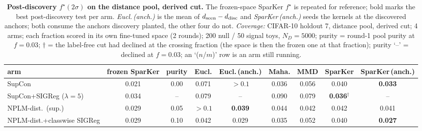 \begin{table}[t]
\centering
\footnotesize
\begin{tabular}{lcccccccc}
\toprule
arm & frozen SparKer & purity & Eucl. & Eucl.\,(anch.) & Maha. & MMD & SparKer & SparKer\,(anch.) \\
\midrule
SupCon & 0.021 & 0.00 & 0.071 & $>0.1$ & 0.036 & 0.056 & 0.040 & \textbf{0.033} \\
\addlinespace
SupCon+SIGReg ($\lambda{=}5$) & 0.034 & -- & 0.079 & -- & 0.090 & 0.079 & \textbf{0.036$^\dagger$} & -- \\
\addlinespace
NPLM-dist.\ (sup.) & 0.029 & 0.05 & $>0.1$ & \textbf{0.039} & 0.044 & 0.042 & 0.042 & 0.041 \\
\addlinespace
NPLM-dist.+classwise SIGReg & 0.029 & 0.10 & 0.042 & 0.029 & 0.035 & 0.052 & 0.040 & \textbf{0.027} \\
\bottomrule
\end{tabular}
\caption{\textbf{Post-discovery $f^\star(2\sigma)$ on the distance pool, derived cut.} The frozen-space SparKer $f^\star$ is repeated for reference; bold marks the best post-discovery test per arm. \emph{Eucl.\,(anch.)} is the mean of $d_{\rm seen}-d_{\rm disc}$ and \emph{SparKer\,(anch.)} seeds the kernels at the discovered anchors; both consume the anchors discovery planted, the other four do not. \emph{Coverage:} CIFAR-10 holdout 7, distance pool, derived cut; 4 arms; each fraction scored in its own fine-tuned space (2 rounds); 200 null / 50 signal toys, $N_D{=}5000$; purity = round-1 pool purity at $f{=}0.03$; $\dagger$ = the label-free cut had declined at the crossing fraction (the space is then the frozen one at that fraction); purity `--' = declined at $f{=}0.03$; an `($n$/$m$)' row is an arm still running.}
\label{tab:sigma_post_cifar10_h7_legal}
\end{table}
